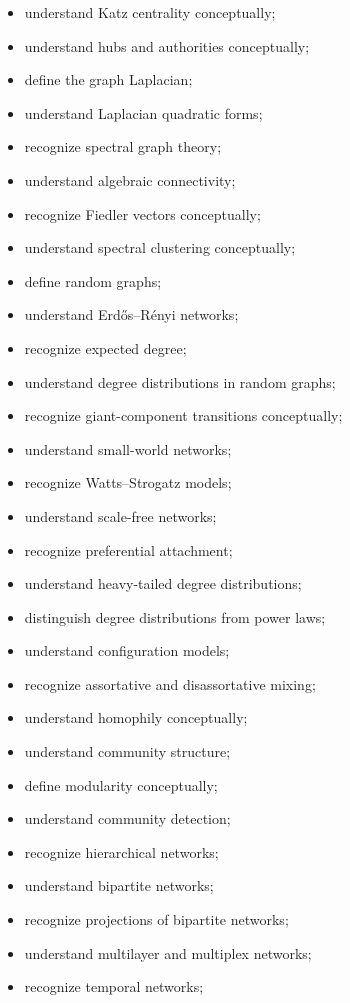 {\begin{itemize}
    \item understand Katz centrality conceptually;
    \item understand hubs and authorities conceptually;
    \item define the graph Laplacian;
    \item understand Laplacian quadratic forms;
    \item recognize spectral graph theory;
    \item understand algebraic connectivity;
    \item recognize Fiedler vectors conceptually;
    \item understand spectral clustering conceptually;
    \item define random graphs;
    \item understand Erdős--Rényi networks;
    \item recognize expected degree;
    \item understand degree distributions in random graphs;
    \item recognize giant-component transitions conceptually;
    \item understand small-world networks;
    \item recognize Watts--Strogatz models;
    \item understand scale-free networks;
    \item recognize preferential attachment;
    \item understand heavy-tailed degree distributions;
    \item distinguish degree distributions from power laws;
    \item understand configuration models;
    \item recognize assortative and disassortative mixing;
    \item understand homophily conceptually;
    \item understand community structure;
    \item define modularity conceptually;
    \item understand community detection;
    \item recognize hierarchical networks;
    \item understand bipartite networks;
    \item recognize projections of bipartite networks;
    \item understand multilayer and multiplex networks;
    \item recognize temporal networks;

\end{itemize}}
